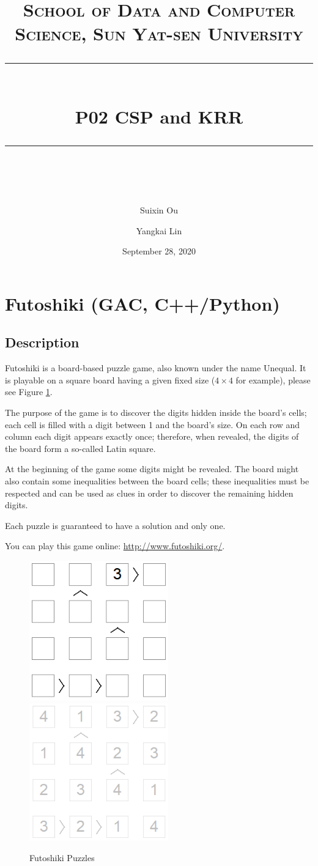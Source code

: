 ﻿\documentclass[a4paper, 11pt]{article}
\title{	
\normalfont \normalsize
\textsc{School of Data and Computer Science, Sun Yat-sen University} \\ [25pt] %
\rule{\textwidth}{0.5pt} \\[0.4cm] %
\huge  P02  CSP and KRR\\ %
\rule{\textwidth}{2pt} \\[0.5cm] %
\author{Suixin Ou \and Yangkai Lin}
\date{September 28, 2020}
}
\begin{document}
\maketitle
\tableofcontents
\newpage







\section{Futoshiki (GAC, C++/Python)}
\subsection{Description}
Futoshiki is a board-based puzzle game, also known under the name Unequal. It is playable on a square board having a given fixed size ($4\times4$ for example), please see Figure \ref{fig:futoshiki}.

The purpose of the game is to discover the digits hidden inside the board's cells; each cell is filled with a digit between 1 and the board's size. On each row and column each digit appears exactly once; therefore, when revealed, the digits of the board form a so-called Latin square.

At the beginning of the game some digits might be revealed. The board might also contain some inequalities between the board cells; these inequalities must be respected and can be used as clues in order to discover the remaining hidden digits.

Each puzzle is guaranteed to have a solution and only one.

You can play this game online: \url{http://www.futoshiki.org/}.
\begin{figure}[h]
  \centering
  \includegraphics[width=6cm]{Pic/futoshiki1}
  \qquad
  \includegraphics[width=6cm]{Pic/futoshiki2}
  \caption{Futoshiki Puzzles}
  \label{fig:futoshiki}
\end{figure}
\end{document}
